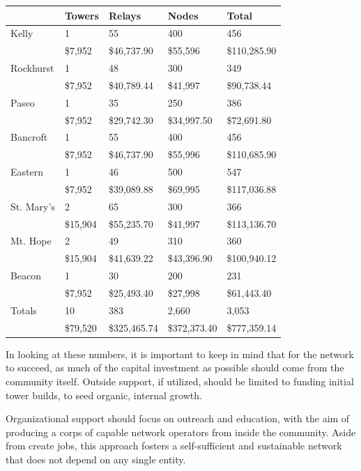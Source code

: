 \begin{center}
\begin{tabular}{|p{3cm}|l|l|l|l|}
\hline
  & Towers & Relays & Nodes & Total \\ \hline
Kelly & 1 & 55 & 400 & 456 \\ \hline
  & \$7,952 & \$46,737.90 & \$55,596 & \$110,285.90 \\ \hline
Rockhurst & 1 & 48 & 300 & 349 \\ \hline
  & \$7,952 & \$40,789.44 & \$41,997 & \$90,738.44 \\ \hline
Paseo & 1 & 35 & 250 & 386 \\ \hline
  & \$7,952 & \$29,742.30 & \$34,997.50 & \$72,691.80 \\ \hline
Bancroft & 1 & 55 & 400 & 456 \\ \hline
  & \$7,952 & \$46,737.90 & \$55,996 & \$110,685.90 \\ \hline
Eastern & 1 & 46 & 500 & 547 \\ \hline
  & \$7,952 & \$39,089.88 & \$69,995 & \$117,036.88 \\ \hline
St. Mary's & 2 & 65 & 300 & 366 \\ \hline
  & \$15,904 & \$55,235.70 & \$41,997 & \$113,136.70 \\ \hline
Mt. Hope & 2 & 49 & 310 & 360 \\ \hline
  & \$15,904 & \$41,639.22 & \$43,396.90 & \$100,940.12 \\ \hline
Beacon & 1 & 30 & 200 & 231 \\ \hline
  & \$7,952 & \$25,493.40 & \$27,998 & \$61,443.40 \\ \hline
Totals & 10 & 383 & 2,660 & 3,053 \\ \hline
  & \$79,520 & \$325,465.74 & \$372,373.40 & \$777,359.14 \\ \hline
\end{tabular}
\end{center}

In looking at these numbers, it is important to keep in mind that for the network to 
succeed, as much of the capital investment as possible should come from the community
itself. Outside support, if utilized, should be limited to funding initial tower builds,
to seed organic, internal growth. \par
Organizational support should focus on outreach and education, with the aim of producing
a corps of capable network operators from inside the community. Aside from create jobs,
this approach fosters a self-sufficient and sustainable network that does not depend on
any single entity.
